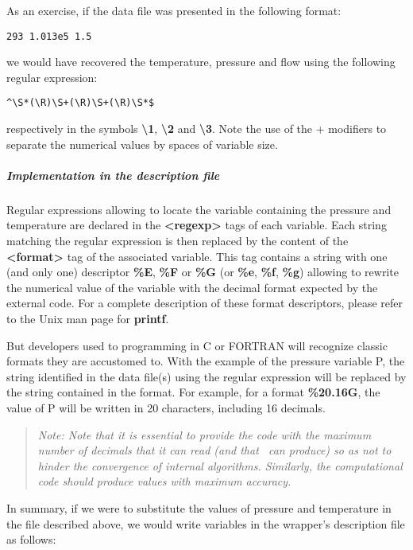 As an exercise, if the data file was presented in the following format:
\lstset{language=C++, basicstyle=\normalsize}
\begin{lstlisting}[frame=TBRL]
293 1.013e5 1.5
\end{lstlisting}
we would have recovered the temperature, pressure and flow using the following regular expression:
\lstset{language=C++, basicstyle=\normalsize}
\begin{lstlisting}[frame=TBRL]
^\S*(\R)\S+(\R)\S+(\R)\S*$
\end{lstlisting}

respectively in the symbols {\bf \textbackslash 1}, {\bf \textbackslash 2} and {\bf \textbackslash 3}. Note the use of the + modifiers to separate the numerical values by spaces of variable size.

\subparagraph{Implementation in the description file}

Regular expressions allowing to locate the variable containing the pressure and temperature are declared in the {\bf <regexp>} tags of each variable. Each string matching the regular expression is then replaced by the content of the {\bf <format>} tag of the associated variable. This tag contains a string with one (and only one) descriptor {\bf \%E}, {\bf \%F} or {\bf \%G} (or {\bf \%e}, {\bf \%f}, {\bf \%g}) allowing to rewrite the numerical value of the variable with the decimal format expected by the external code. For a complete description of these format descriptors, please refer to the Unix man page for {\bf printf}.

But developers used to programming in C or FORTRAN will recognize classic formats they are accustomed to. With the example of the pressure variable P, the string identified in the data file(s) using the regular expression will be replaced by the string contained in the format. For example, for a format {\bf \%20.16G}, the value of P will be written in 20 characters, including 16 decimals.

\small
\begin{quote}
\textit{Note: Note that it is essential to provide the code with the maximum number of decimals that it can read (and that \OT\ can produce) so as not to hinder the convergence of internal algorithms. Similarly, the computational code should produce values with maximum accuracy.}
\end{quote}
\normalsize

In summary, if we were to substitute the values of pressure and temperature in the file described above, we would write variables in the wrapper's description file as follows:

